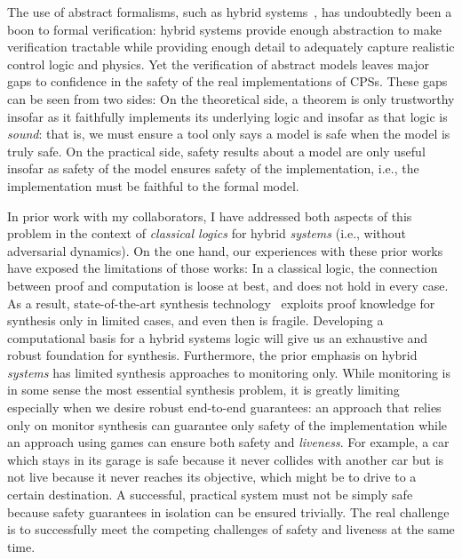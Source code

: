 \documentclass[12pt]{cmuthesis}
\theoremstyle{definition}
\theoremstyle{remark}
\begin{document}
The use of abstract formalisms, such as hybrid systems~\cite{DBLP:conf/lics/Henzinger96}, has undoubtedly been a boon to formal verification: hybrid systems provide enough abstraction to make verification tractable while providing enough detail to adequately capture realistic control logic and physics.
Yet the verification of abstract models leaves major gaps to confidence in the safety of the real implementations of CPSs.
These gaps can be seen from two sides: On the theoretical side, a theorem is only trustworthy insofar as it faithfully implements its underlying logic and insofar as that logic is \emph{sound}: that is, we must ensure a tool only says a model is safe when the model is truly safe.
On the practical side, safety results about a model are only useful insofar as safety of the model ensures safety of the implementation, i.e., the implementation must be faithful to the formal model.

In prior work with my collaborators, I have addressed both aspects of this problem in the context of \emph{classical logics} for hybrid \emph{systems} (i.e., without adversarial dynamics).
On the one hand, our experiences with these prior works have exposed the limitations of those works:
In a classical logic, the connection between proof and computation is loose at best, and does not hold in every case.
As a result, state-of-the-art synthesis technology~\cite{DBLP:journals/fmsd/MitschP16} exploits proof knowledge for synthesis only in limited cases, and even then is fragile.
Developing a computational basis for a hybrid systems logic will give us an exhaustive and robust foundation for synthesis.
Furthermore, the prior emphasis on hybrid \emph{systems} has limited synthesis approaches to monitoring only.
While monitoring is in some sense the most essential synthesis problem, it is greatly limiting especially when we desire robust end-to-end guarantees: an approach that relies only on monitor synthesis can guarantee only safety of the implementation while an approach using games can ensure both safety and \emph{liveness}.
For example, a car which stays in its garage is safe because it never collides with another car but is not live because it never reaches its objective, which might be to drive to a certain destination.
A successful, practical system must not be simply safe because safety guarantees in isolation can be ensured trivially.
The real challenge is to successfully meet the competing challenges of safety and liveness at the same time.
\end{document}

